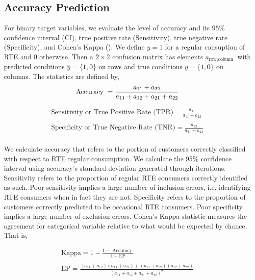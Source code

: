 \documentclass[a4,12pt]{article}
\begin{document}
\subsection{Accuracy Prediction}
For binary target variables, we evaluate the level of accuracy and its $95 \%$ confidence interval (CI), true positive rate (Sensitivity), true negative rate (Specificity), and Cohen's Kappa (\cite{Cohen60}). We define  $y=1$ for a regular consuption of RTE and 0 otherwise. Then a $2 \times 2$ confusion matrix has elements $a_{\text {row,column }}$ with predicted conditions $\widehat{y}=\{1,0\}$ on rows and true conditions $y=\{1,0\}$ on columns. The statistics are defined by,
\begin{equation}
\text {Accuracy }=\frac{a_{11}+a_{22}}{a_{11}+a_{12}+a_{21}+a_{22}}\\
\end{equation}

\begin{equation}
\begin{array}{l}
\text {Sensitivity or True Positive Rate (TPR)} =\frac{a_{11}}{a_{11}+a_{12}}\\
\\
\text {Specificity or True Negative Rate (TNR)} =\frac{a_{22}}{a_{21}+a_{22}}
\end{array}{}
\end{equation}
\\
We calculate accuracy that refers to the portion of customers correctly classified with respect to RTE regular consumption.
We calculate the 95\% confidence interval using accuracy’s standard deviation generated through iterations. 
Sensitivity refers to the proportion of regular RTE consumers correctly identified as such. Poor sensitivity implies a large number of inclusion errors, i.e. identifying RTE consumers when in fact they are not.  Specificity refers to the proportion of customers correctly predicted to be occasional RTE consumers. Poor specificity implies a large number of exclusion errors. Cohen's Kappa statistic measures the agreement for categorical variable relative to what would be expected by chance. That is,

\begin{equation}
\begin{array}{l}
\text{Kappa}=1-\frac{1-\text { Accuracy }}{1-\mathrm{EP}} \\
\\
\text{EP}=\frac{\left(a_{11}+a_{12}\right)\left(a_{11}+a_{21}\right)+\left(a_{21}+a_{22}\right)\left(a_{12}+a_{22}\right)}{\left(a_{11}+a_{12}+a_{21}+a_{22}\right)^{2}}
\end{array}
\end{equation}
\end{document}
